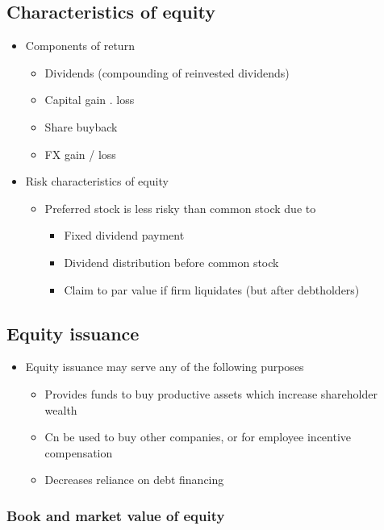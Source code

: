 \documentclass[../notes_compiled.tex]{subfiles}
\begin{document}
\subsection{Characteristics of equity}
\begin{itemize}
\item Components of return
\begin{itemize}
\item Dividends (compounding of reinvested dividends)
\item Capital gain . loss
\item Share buyback
\item FX gain / loss
\end{itemize}
\item Risk characteristics of equity
\begin{itemize}
\item Preferred stock is less risky than common stock due to
\begin{itemize}
\item Fixed dividend payment
\item Dividend distribution before common stock
\item Claim to par value if firm liquidates (but after debtholders)
\end{itemize}
\end{itemize}
\end{itemize}

\subsection{Equity issuance}
\begin{itemize}
\item Equity issuance may serve any of the following purposes
\begin{itemize}
\item Provides funds to buy productive assets which increase shareholder wealth
\item Cn be used to buy other companies, or for employee incentive compensation
\item Decreases reliance on debt financing
\end{itemize}
\end{itemize}

\subsubsection{Book and market value of equity}
\end{document}

